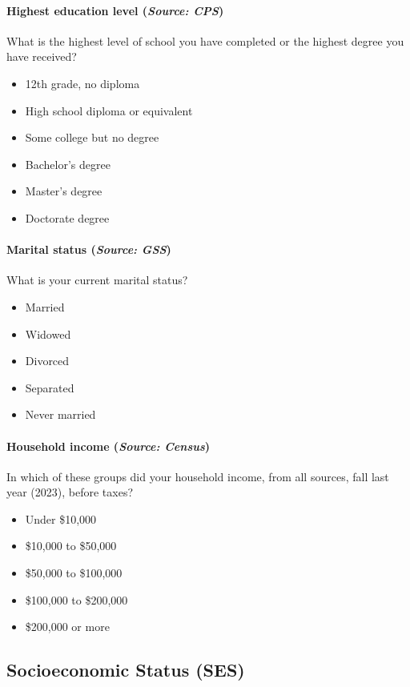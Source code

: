 \documentclass[letterpaper,12pt]{article}
\theoremstyle{proposition}
\begin{document}
\paragraph{Highest education level (\textit{Source: CPS})}
What is the highest level of school you have completed or the highest degree you have received?
\begin{itemize}[itemsep=-10pt,topsep=0pt]
\item 12th grade, no diploma
\item High school diploma or equivalent
\item Some college but no degree
\item Bachelor’s degree
\item Master’s degree
\item Doctorate degree
\end{itemize}

\paragraph{Marital status (\textit{Source: GSS})}
What is your current marital status?
\begin{itemize}[itemsep=-10pt,topsep=0pt]
\item Married
\item Widowed
\item Divorced
\item Separated
\item Never married
\end{itemize}

\paragraph{Household income (\textit{Source: Census})}
In which of these groups did your household income, from all sources, fall last year (2023), before taxes?
\begin{itemize}[itemsep=-10pt,topsep=0pt]
\item Under \$10,000
\item \$10,000 to \$50,000
\item \$50,000 to \$100,000
\item \$100,000 to \$200,000
\item \$200,000 or more
\end{itemize}


\subsection*{Socioeconomic Status (SES)}
\end{document}
